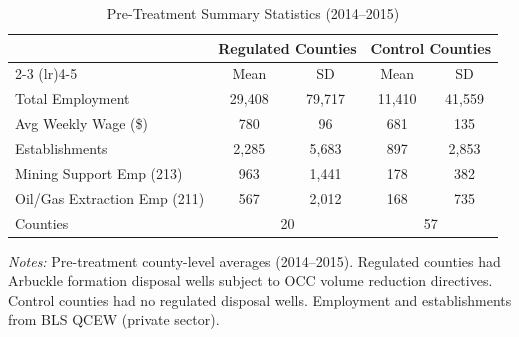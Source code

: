 \begin{table}[htbp]
\centering
\caption{Pre-Treatment Summary Statistics (2014--2015)}
\label{tab:summary}
\begin{threeparttable}
\begin{tabular}{lcccc}
\toprule
 & \multicolumn{2}{c}{Regulated Counties} & \multicolumn{2}{c}{Control Counties} \\
\cmidrule(lr){2-3} \cmidrule(lr){4-5}
 & Mean & SD & Mean & SD \\
\midrule
Total Employment & 29,408 & 79,717 & 11,410 & 41,559 \\
Avg Weekly Wage (\$) & 780 & 96 & 681 & 135 \\
Establishments & 2,285 & 5,683 & 897 & 2,853 \\
Mining Support Emp (213) & 963 & 1,441 & 178 & 382 \\
Oil/Gas Extraction Emp (211) & 567 & 2,012 & 168 & 735 \\
\midrule
Counties & \multicolumn{2}{c}{20} & \multicolumn{2}{c}{57} \\
\bottomrule
\end{tabular}
\begin{tablenotes}[flushleft]\footnotesize
\item \textit{Notes:} Pre-treatment county-level averages (2014--2015). Regulated counties had Arbuckle formation disposal wells subject to OCC volume reduction directives. Control counties had no regulated disposal wells. Employment and establishments from BLS QCEW (private sector).
\end{tablenotes}
\end{threeparttable}
\end{table}

